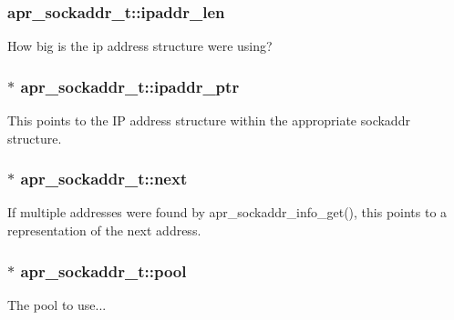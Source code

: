 \subsubsection[{\texorpdfstring{ipaddr\+\_\+len}{ipaddr_len}}]{ apr\+\_\+sockaddr\+\_\+t\+::ipaddr\+\_\+len}\hypertarget{structapr__sockaddr__t_a81be21b2eb968b83ca36183213c99867}{}\label{structapr__sockaddr__t_a81be21b2eb968b83ca36183213c99867}
How big is the ip address structure we\textquotesingle{}re using? 
\subsubsection[{\texorpdfstring{ipaddr\+\_\+ptr}{ipaddr_ptr}}]{$\ast$ apr\+\_\+sockaddr\+\_\+t\+::ipaddr\+\_\+ptr}\hypertarget{structapr__sockaddr__t_a6e1b71121ada4047acde36c6777b5442}{}\label{structapr__sockaddr__t_a6e1b71121ada4047acde36c6777b5442}
This points to the IP address structure within the appropriate sockaddr structure. 
\subsubsection[{\texorpdfstring{next}{next}}]{$\ast$ apr\+\_\+sockaddr\+\_\+t\+::next}\hypertarget{structapr__sockaddr__t_a774835c6b8e3adf255b752e8b126c434}{}\label{structapr__sockaddr__t_a774835c6b8e3adf255b752e8b126c434}
If multiple addresses were found by apr\+\_\+sockaddr\+\_\+info\+\_\+get(), this points to a representation of the next address. 
\subsubsection[{\texorpdfstring{pool}{pool}}]{$\ast$ apr\+\_\+sockaddr\+\_\+t\+::pool}\hypertarget{structapr__sockaddr__t_a5f2d72a6a181cf2f54ba7c922aa0dfab}{}\label{structapr__sockaddr__t_a5f2d72a6a181cf2f54ba7c922aa0dfab}
The pool to use... 
